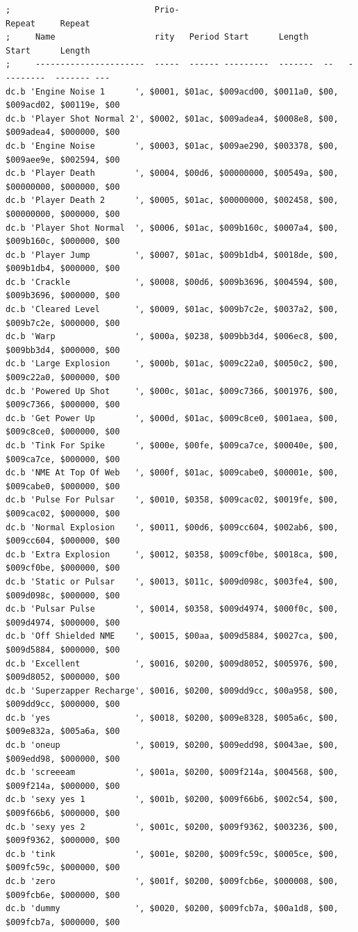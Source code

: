 \begin{lstlisting}[caption=The contents of \icode{samtab} at \icode{\$9AC800}.]
;                             Prio-                                  Repeat     Repeat
;     Name                    rity   Period Start      Length        Start      Length      
;     ----------------------  -----  ------ ---------  -------  --   ---------  ------- ---
dc.b 'Engine Noise 1      ', $0001, $01ac, $009acd00, $0011a0, $00, $009acd02, $00119e, $00
dc.b 'Player Shot Normal 2', $0002, $01ac, $009adea4, $0008e8, $00, $009adea4, $000000, $00
dc.b 'Engine Noise        ', $0003, $01ac, $009ae290, $003378, $00, $009aee9e, $002594, $00
dc.b 'Player Death        ', $0004, $00d6, $00000000, $00549a, $00, $00000000, $000000, $00
dc.b 'Player Death 2      ', $0005, $01ac, $00000000, $002458, $00, $00000000, $000000, $00
dc.b 'Player Shot Normal  ', $0006, $01ac, $009b160c, $0007a4, $00, $009b160c, $000000, $00
dc.b 'Player Jump         ', $0007, $01ac, $009b1db4, $0018de, $00, $009b1db4, $000000, $00
dc.b 'Crackle             ', $0008, $00d6, $009b3696, $004594, $00, $009b3696, $000000, $00
dc.b 'Cleared Level       ', $0009, $01ac, $009b7c2e, $0037a2, $00, $009b7c2e, $000000, $00
dc.b 'Warp                ', $000a, $0238, $009bb3d4, $006ec8, $00, $009bb3d4, $000000, $00
dc.b 'Large Explosion     ', $000b, $01ac, $009c22a0, $0050c2, $00, $009c22a0, $000000, $00
dc.b 'Powered Up Shot     ', $000c, $01ac, $009c7366, $001976, $00, $009c7366, $000000, $00
dc.b 'Get Power Up        ', $000d, $01ac, $009c8ce0, $001aea, $00, $009c8ce0, $000000, $00
dc.b 'Tink For Spike      ', $000e, $00fe, $009ca7ce, $00040e, $00, $009ca7ce, $000000, $00
dc.b 'NME At Top Of Web   ', $000f, $01ac, $009cabe0, $00001e, $00, $009cabe0, $000000, $00
dc.b 'Pulse For Pulsar    ', $0010, $0358, $009cac02, $0019fe, $00, $009cac02, $000000, $00
dc.b 'Normal Explosion    ', $0011, $00d6, $009cc604, $002ab6, $00, $009cc604, $000000, $00
dc.b 'Extra Explosion     ', $0012, $0358, $009cf0be, $0018ca, $00, $009cf0be, $000000, $00
dc.b 'Static or Pulsar    ', $0013, $011c, $009d098c, $003fe4, $00, $009d098c, $000000, $00
dc.b 'Pulsar Pulse        ', $0014, $0358, $009d4974, $000f0c, $00, $009d4974, $000000, $00
dc.b 'Off Shielded NME    ', $0015, $00aa, $009d5884, $0027ca, $00, $009d5884, $000000, $00
dc.b 'Excellent           ', $0016, $0200, $009d8052, $005976, $00, $009d8052, $000000, $00
dc.b 'Superzapper Recharge', $0016, $0200, $009dd9cc, $00a958, $00, $009dd9cc, $000000, $00
dc.b 'yes                 ', $0018, $0200, $009e8328, $005a6c, $00, $009e832a, $005a6a, $00
dc.b 'oneup               ', $0019, $0200, $009edd98, $0043ae, $00, $009edd98, $000000, $00
dc.b 'screeeam            ', $001a, $0200, $009f214a, $004568, $00, $009f214a, $000000, $00
dc.b 'sexy yes 1          ', $001b, $0200, $009f66b6, $002c54, $00, $009f66b6, $000000, $00
dc.b 'sexy yes 2          ', $001c, $0200, $009f9362, $003236, $00, $009f9362, $000000, $00
dc.b 'tink                ', $001e, $0200, $009fc59c, $0005ce, $00, $009fc59c, $000000, $00
dc.b 'zero                ', $001f, $0200, $009fcb6e, $000008, $00, $009fcb6e, $000000, $00
dc.b 'dummy               ', $0020, $0200, $009fcb7a, $00a1d8, $00, $009fcb7a, $000000, $00
\end{lstlisting}


